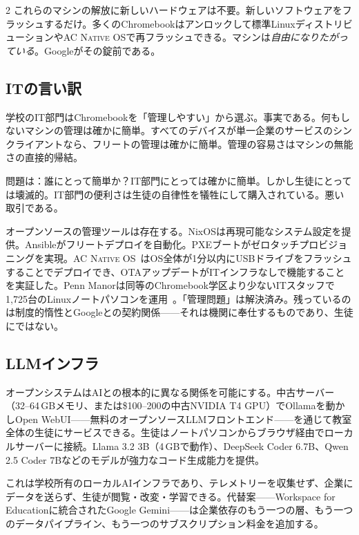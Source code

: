 \documentclass[11pt, a4paper]{article}
\newcommand{\acos}{\textsc{AC Native OS}}
\begin{document}
\begin{multicols}{2}
これらのマシンの解放に新しいハードウェアは不要。新しいソフトウェアをフラッシュするだけ。多くのChromebookはアンロックして標準Linuxディストリビューションや\acos{}で再フラッシュできる。マシンは\emph{自由になりたがっている}。Googleがその錠前である。

\subsection{ITの言い訳}

学校のIT部門はChromebookを「管理しやすい」から選ぶ。事実である。何もしないマシンの管理は確かに簡単。すべてのデバイスが単一企業のサービスのシンクライアントなら、フリートの管理は確かに簡単。管理の容易さはマシンの無能さの直接的帰結。

問題は：誰にとって簡単か？IT部門にとっては確かに簡単。しかし生徒にとっては壊滅的。IT部門の便利さは生徒の自律性を犠牲にして購入されている。悪い取引である。

オープンソースの管理ツールは存在する。NixOSは再現可能なシステム設定を提供。Ansibleがフリートデプロイを自動化。PXEブートがゼロタッチプロビジョニングを実現。\acos{}~\citep{scudder2026acos}はOS全体が1分以内にUSBドライブをフラッシュすることでデプロイでき、OTAアップデートがITインフラなしで機能することを実証した。Penn Manorは同等のChromebook学区より少ないITスタッフで1,725台のLinuxノートパソコンを運用~\citep{pennmanor2024linux}。「管理問題」は解決済み。残っているのは制度的惰性とGoogleとの契約関係——それは機関に奉仕するものであり、生徒にではない。

\subsection{LLMインフラ}

オープンシステムはAIとの根本的に異なる関係を可能にする。中古サーバー（32--64\,GBメモリ、または\$100--200の中古NVIDIA T4 GPU）でOllamaを動かしOpen WebUI——無料のオープンソースLLMフロントエンド——を通じて教室全体の生徒にサービスできる。生徒はノートパソコンからブラウザ経由でローカルサーバーに接続。Llama 3.2 3B（4\,GBで動作）、DeepSeek Coder 6.7B、Qwen 2.5 Coder 7Bなどのモデルが強力なコード生成能力を提供。

これは学校所有のローカルAIインフラであり、テレメトリーを収集せず、企業にデータを送らず、生徒が閲覧・改変・学習できる。代替案——Workspace for Educationに統合されたGoogle Gemini——は企業依存のもう一つの層、もう一つのデータパイプライン、もう一つのサブスクリプション料金を追加する。



\end{multicols}
\end{document}
